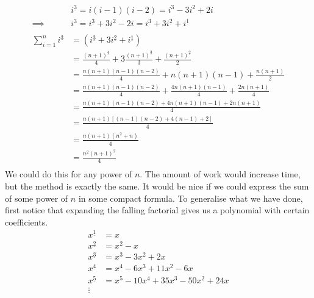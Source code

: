 \documentclass[12pt]{article}
\theoremstyle{definition}
\begin{document}
\begin{align*}
                     & i^{\underline{3}} = i(i-1)(i-2) = i^3 - 3i^2 + 2i                                                      \\
    \implies         & i^3 = i^{\underline{3}} + 3i^2 - 2i = i^{\underline{3}} + 3i^{\underline{2}} + i^{\underline{1}}       \\
    \\
    \sum_{i=1}^n i^3 & = (i^{\underline{3}} + 3i^{\underline{2}} + i^{\underline{1}})                                         \\
                     & = \frac{(n+1)^{\underline{4}}}{4} + 3\frac{(n+1)^{\underline{3}}}{3} + \frac{(n+1)^{\underline{2}}}{2} \\
                     & = \frac{n(n+1)(n-1)(n-2)}{4} + n(n+1)(n-1) + \frac{n(n+1)}{2}                                          \\
                     & = \frac{n(n+1)(n-1)(n-2)}{4} + \frac{4n(n+1)(n-1)}{4} + \frac{2n(n+1)}{4}                              \\
                     & = \frac{n(n+1)(n-1)(n-2) + 4n(n+1)(n-1) +2n(n+1)}{4}                                                   \\
                     & = \frac{n(n+1)[(n-1)(n-2) + 4(n-1) + 2]}{4}                                                            \\
                     & = \frac{n(n+1)(n^2+n)}{4}                                                                              \\
                     & = \frac{n^2(n+1)^2}{4}                                                                                 \\
\end{align*}
We could do this for any power of $n$. The amount of work would increase time, but the method is exactly the same. It would be nice if we could express the sum of some power of $n$ in some compact formula. To generalise what we have done, first notice that expanding the falling factorial gives us a polynomial with certain coefficients.
\begin{align*}
    x^{\underline{1}} & = x                                     \\
    x^{\underline{2}} & = x^2 - x                               \\
    x^{\underline{3}} & = x^3 - 3x^2 + 2x                       \\
    x^{\underline{4}} & = x^{4} - 6 x^3 + 11 x^2 - 6 x          \\
    x^{\underline{5}} & = x^5 - 10 x^4 + 35 x^3 - 50 x^2 + 24 x \\
    \vdots
\end{align*}
\end{document}
